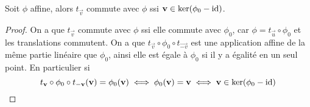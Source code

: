 \begin{proposition}
	Soit $\phi$ affine, alors $t_{\vec{v}}$ commute avec $\phi$ ssi $\mathbf{v} \in
	\ker(\phi_0 - \operatorname{id})$.
\end{proposition}

\begin{proof}	
	On a que $t_{\vec{v}}$ commute avec $\phi$ ssi elle commute avec $\phi_0$,
	car $\phi = t_{\vec{u}} \circ \phi_0$ et les translations commutent.
	On a que $t_{\vec{v}}\circ \phi_0 \circ t_{\vec{-v}}$ est une application
	affine de la même partie linéaire que $\phi_0$, ainsi elle est égale à
	$\phi_0$ si il y a égalité en un seul point. En particulier si
	\begin{equation*}
		t_{\mathbf{v}} \circ \phi_0 \circ t_{\mathbf{-v}} (\mathbf{v}) = \phi_0(\mathbf{v})	
		\iff \phi_0(\mathbf{v}) = \mathbf{v} \iff \mathbf{v} \in \ker(\phi_0 - \operatorname{id})
	\end{equation*}
\end{proof}

